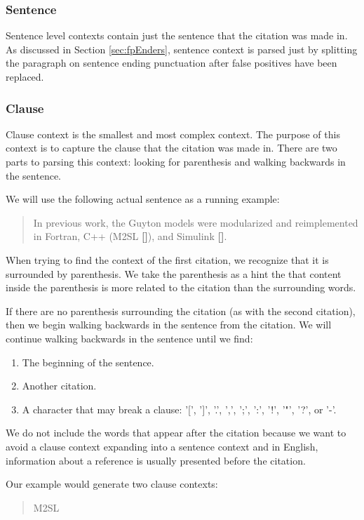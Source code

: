 \documentclass[10pt, conference, compsocconf]{IEEEtran}
\begin{document}
\subsubsection{Sentence}
Sentence level contexts contain just the sentence that the citation was made in. As discussed in Section \ref{sec:fpEnders},
sentence context is parsed just by splitting the paragraph on sentence ending punctuation after false positives have been replaced.

\subsubsection{Clause}
Clause context is the smallest and most complex context. The purpose of this context is to capture the clause that the citation was made in.
There are two parts to parsing this context: looking for parenthesis and walking backwards in the sentence.

We will use the following actual sentence as a running example:
\begin{quote}
In previous work, the Guyton models were modularized and reimplemented in Fortran, C++ (M2SL \textbf{[]}), and Simulink \textbf{[]}.
\end{quote}

When trying to find the context of the first citation, we recognize that it is surrounded by parenthesis.
We take the parenthesis as a hint the that content inside the parenthesis is more related to the citation than the surrounding words.

If there are no parenthesis surrounding the citation (as with the second citation), then we begin walking backwards in the sentence from the citation.
We will continue walking backwards in the sentence until we find:
\begin{enumerate}
   \item The beginning of the sentence.
   \item Another citation.
   \item A character that may break a clause: '[', ']', '.', ',', ';', ':', '!', '"', '?', or '-'.
\end{enumerate}

We do not include the words that appear after the citation because we want to avoid a clause context expanding into a sentence context and
in English, information about a reference is usually presented before the citation.

Our example would generate two clause contexts:
\begin{quote}
M2SL
\end{quote}
\end{document}
